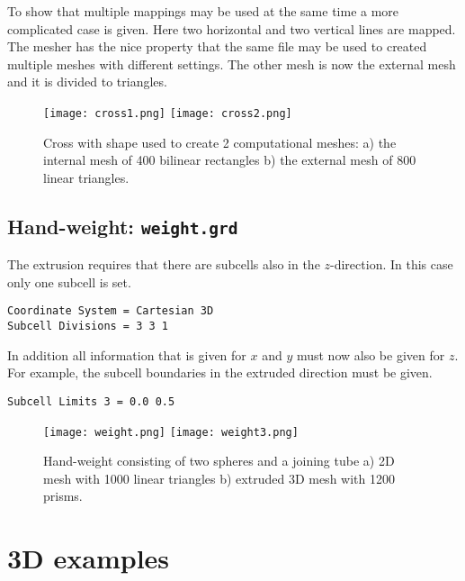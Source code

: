 To show that multiple mappings may be used at the same time
a more complicated case is given. Here two horizontal and two vertical lines
are mapped. The mesher has the nice property that the same file may be used
to created multiple meshes with different settings. The other mesh is now
the external mesh and it is divided to triangles.


\begin{figure}
\begin{center}
\texttt{[image: cross1.png]}
\texttt{[image: cross2.png]}
\end{center}
\caption{Cross with shape used to create 2 computational meshes:
      a) the internal mesh of 400 bilinear rectangles
      b) the external mesh of 800 linear triangles.}
\label{pic7}
\end{figure}

\subsection*{Hand-weight: \texttt{weight.grd}}


%
The extrusion requires that there are subcells also in the 
$z$-direction. In this case only one subcell is set.
\begin{verbatim}
Coordinate System = Cartesian 3D
Subcell Divisions = 3 3 1
\end{verbatim}

\noindent
In addition all information that is given for $x$ and $y$
must now also be given for $z$. For example, the 
subcell boundaries in the extruded direction must be given.
\begin{verbatim}
Subcell Limits 3 = 0.0 0.5
\end{verbatim}

\begin{figure}
\begin{center}
\texttt{[image: weight.png]} 
\texttt{[image: weight3.png]}
\end{center}
\caption{Hand-weight consisting of two spheres and a joining tube
      a) 2D mesh with 1000 linear triangles
	b) extruded 3D mesh with 1200 prisms.}
\label{pic8}
\end{figure}



\section{3D examples}

